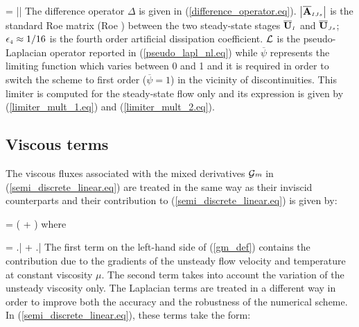 %
\beq
   = 
  \left|\right|
  \label{artifical_diffusion}
\eeq
%
 The difference operator $\Delta$ is given in (\ref{difference_operator.eq}).
 $\left|\overline{\bf A}_{\mbox{\tiny $IJs$}}\right|$ is the standard Roe matrix
 (Roe ) between the two steady-state stages
 $\overline{\bf U}_{\mbox{\tiny $I$}}$ and $\overline{\bf U}_{\mbox{\tiny $Js$}}$;
 $\epsilon_{\mbox{\tiny $4$}}\approx 1/16$ is the fourth order artificial dissipation
 coefficient. ${\cal L}$ is the pseudo-Laplacian operator
 reported in (\ref{pseudo_lapl_nl.eq}) while
 $\overline{\psi}$ represents the limiting function which varies between
 0 and 1 and it is required in order to switch the scheme to first order
 ($\overline{\psi} = 1$) in the vicinity of discontinuities. This limiter is
 computed for the steady-state flow only and its expression is given by
 (\ref{limiter_mult_1.eq}) and (\ref{limiter_mult_2.eq}).
%
%
\subsection{Viscous terms}
%
 The viscous fluxes associated with the mixed derivatives
 ${\cal G}{\scriptstyle m}$ in (\ref{semi_discrete_linear.eq})
 are treated in the same way as their inviscid
 counterparts and their contribution to (\ref{semi_discrete_linear.eq})
 is given by:

%
\beq
   = 
  \left( +
        \right)\cdot
  \label{viscous_mix}
\eeq
%
 where

%
\beq
   = 
  \left.\right|\sm{\overline{\mu}} +
  \left.\right|
  \label{gm_def}
\eeq
%
 The first term on the left-hand side of (\ref{gm_def}) contains the contribution 
 due to the  gradients of the unsteady flow velocity and temperature at constant viscosity $\mu$.
 The second term takes into account the variation of the unsteady viscosity only.
 The Laplacian terms are treated in a different way in order to
 improve both the accuracy and the robustness of the numerical scheme.
 In (\ref{semi_discrete_linear.eq}), these terms take the form:

